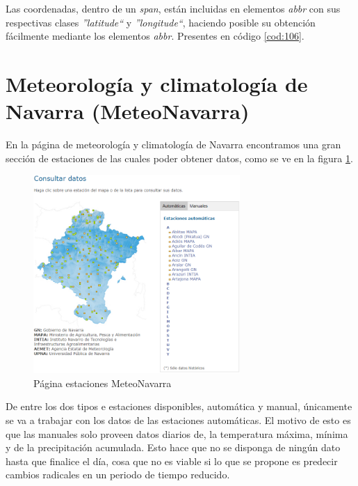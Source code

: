 Las coordenadas, dentro de un \textit{span}, están incluidas en elementos \textit{abbr} con sus respectivas clases \textit{''latitude``} y \textit{''longitude``}, haciendo posible su obtención fácilmente mediante los elementos \textit{abbr}. Presentes en código \ref{cod:106}.

\section{Meteorología y climatología de Navarra (MeteoNavarra)}
En la página de meteorología y climatología de Navarra encontramos una gran sección de estaciones de las cuales poder obtener datos, como se ve en la figura \ref{fig:ej27}.

\begin{figure} [H]
	\centering
	\includegraphics[width=0.7\textwidth]{fig/MeteoNavarraCode.png}
	\caption[Página estaciones MeteoNavarra]{Página estaciones MeteoNavarra}
	\label{fig:ej27}
\end{figure}

De entre los dos tipos e estaciones disponibles, automática y manual, únicamente se va a trabajar con los datos de las estaciones automáticas. El motivo de esto es que las manuales solo proveen datos diarios de, la temperatura máxima, mínima y de la precipitación acumulada. Esto hace que no se disponga de ningún dato hasta que finalice el día, cosa que no es viable si lo que se propone es predecir cambios radicales en un periodo de tiempo reducido.

